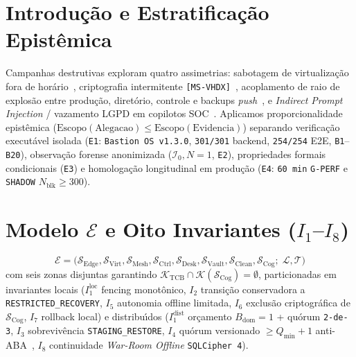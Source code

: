 \documentclass[10pt,twocolumn]{article}
\begin{document}
\section{Introdu\c{c}\~{a}o e Estratifica\c{c}\~{a}o Epist\^{e}mica}

Campanhas destrutivas exploram quatro assimetrias: sabotagem de virtualiza\c{c}\~{a}o fora de hor\'{a}rio~\cite{R01,R18,R22}, criptografia intermitente \texttt{[MS-VHDX]}~\cite{R13,R14,R34}, acoplamento de raio de explos\~{a}o entre produ\c{c}\~{a}o, diret\'{o}rio, controle e backups \emph{push}~\cite{R02,R05,R59,R60}, e \emph{Indirect Prompt Injection} / vazamento LGPD em copilotos SOC~\cite{R54,R55,R57,R58}. Aplicamos proporcionalidade epist\^{e}mica ($\mathrm{Escopo}(\mathrm{Alegacao}) \le \mathrm{Escopo}(\mathrm{Evidencia})$) separando verifica\c{c}\~{a}o execut\'{a}vel isolada (\texttt{E1}: \texttt{Bastion OS v1.3.0}, \texttt{301/301} backend, \texttt{254/254} E2E, \texttt{B1}--\texttt{B20}), observa\c{c}\~{a}o forense anonimizada ($\mathcal{I}_0, N=1$, \texttt{E2}), propriedades formais condicionais (\texttt{E3}) e homologa\c{c}\~{a}o longitudinal em produ\c{c}\~{a}o (\texttt{E4}: \texttt{60 min} \texttt{G-PERF} e \texttt{SHADOW} $N_{\mathrm{blk}} \ge 300$).

\section{Modelo $\mathcal{E}$ e Oito Invariantes ($I_1$--$I_8$)}

\begin{equation}
\mathcal{E} = \bigl(\mathcal{S}_{\mathrm{Edge}}, \mathcal{S}_{\mathrm{Virt}}, \mathcal{S}_{\mathrm{Mesh}}, \mathcal{S}_{\mathrm{Ctrl}}, \mathcal{S}_{\mathrm{Desk}}, \mathcal{S}_{\mathrm{Vault}}, \mathcal{S}_{\mathrm{Clean}}, \mathcal{S}_{\mathrm{Cog}};\; \mathcal{L}, \mathcal{T}\bigr)
\end{equation}
com seis zonas disjuntas garantindo $\mathcal{K}_{\mathrm{TCB}} \cap \mathcal{K}(\mathcal{S}_{\mathrm{Cog}}) = \emptyset$, particionadas em invariantes locais ($I_1^{\mathrm{loc}}$ fencing monot\^{o}nico, $I_2$ transi\c{c}\~{a}o conservadora a \texttt{RESTRICTED\_RECOVERY}, $I_5$ autonomia offline limitada, $I_6$ exclus\~{a}o criptogr\'{a}fica de $\mathcal{S}_{\mathrm{Cog}}$, $I_7$ rollback local) e distribu\'{\i}dos ($I_1^{\mathrm{dist}}$ or\c{c}amento $B_{\mathrm{dom}}=1$ + qu\'{o}rum \texttt{2-de-3}, $I_3$ sobreviv\^{e}ncia \texttt{STAGING\_RESTORE}, $I_4$ qu\'{o}rum versionado $\ge Q_{\min}+1$ anti-ABA~\cite{R60}, $I_8$ continuidade \emph{War-Room Offline} \texttt{SQLCipher 4}).
\end{document}
